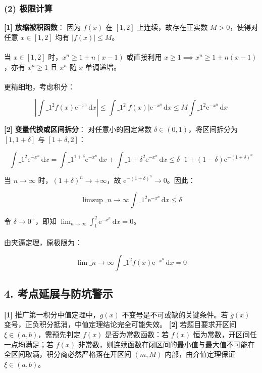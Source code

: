 \documentclass[11pt,a4paper,UTF8]{ctexart}
\begin{document}
\subsubsection{(2) 极限计算}
\begin{solbox}[分步推导与答题规范]
\textbf{[1]}  \textbf{放缩被积函数}：
因为 $f(x)$ 在 $[1, 2]$ 上连续，故存在正实数 $M > 0$，使得对任意 $x \in [1, 2]$ 均有 $|f(x)| \le M$。\\ \\
当 $x \in [1, 2]$ 时，$x^n \ge 1 + n(x-1)$ 或直接利用 $x \ge 1 \implies x^n \ge 1 + n(x-1)$，亦有 $x^n \ge 1$ 且 $x^n$ 随 $x$ 单调递增。\\ \\
更精细地，考虑积分：

\begin{equation*}
\left|\int\_1^2 f(x)\mathrm{e}^{-x^n}\,\mathrm{d}x\right| \le \int\_1^2 |f(x)|\mathrm{e}^{-x^n}\,\mathrm{d}x \le M \int\_1^2 \mathrm{e}^{-x^n}\,\mathrm{d}x
\end{equation*}


\textbf{[2]}  \textbf{变量代换或区间拆分}：
对任意小的固定常数 $\delta \in (0, 1)$，将区间拆分为 $[1, 1+\delta]$ 与 $[1+\delta, 2]$：

\begin{equation*}
\int\_1^2 \mathrm{e}^{-x^n}\,\mathrm{d}x = \int\_1^{1+\delta}\mathrm{e}^{-x^n}\,\mathrm{d}x + \int\_{1+\delta}^2 \mathrm{e}^{-x^n}\,\mathrm{d}x \le \delta \cdot 1 + (1-\delta)\mathrm{e}^{-(1+\delta)^n}
\end{equation*}

当 $n \to \infty$ 时，$(1+\delta)^n \to +\infty$，故 $\mathrm{e}^{-(1+\delta)^n} \to 0$。因此：

\begin{equation*}
\limsup\_{n\to\infty} \int\_1^2 \mathrm{e}^{-x^n}\,\mathrm{d}x \le \delta
\end{equation*}

令 $\delta \to 0^+$，即知 $\lim_{n\to\infty} \int_1^2 \mathrm{e}^{-x^n}\,\mathrm{d}x = 0$。\\ \\
由夹逼定理，原极限为：

\begin{equation*}
\lim\_{n \to \infty} \int\_1^2 f(x)\mathrm{e}^{-x^n}\,\mathrm{d}x = 0
\end{equation*}

\end{solbox}


\subsection{4. 考点延展与防坑警示}
\begin{solbox}[分步推导与答题规范]
\textbf{[1]}  推广第一积分中值定理中，\textit{}$g(x)$ 不变号是不可或缺的关键条件\textit{}。若 $g(x)$ 变号，正负积分抵消，中值定理结论完全可能失效。
\textbf{[2]}  若题目要求开区间 $\xi \in (a, b)$，需预先判定 $f(x)$ 是否为常数函数：若 $f(x)$ 恒为常数，开区间任一点均满足；若 $f(x)$ 非常数，则连续函数在闭区间的最小值与最大值不可能在全区间取满，积分商必然严格落在开区间 $(m, M)$ 内部，由介值定理保证 $\xi \in (a, b)$。
\end{solbox}
\end{document}
